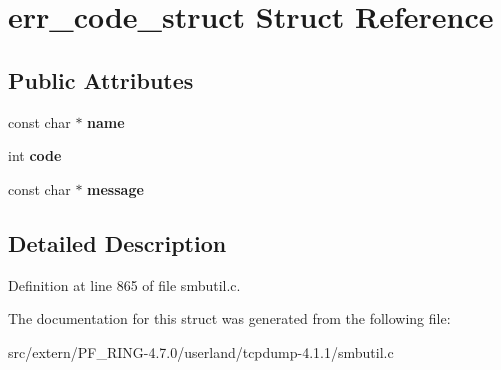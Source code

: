 \hypertarget{structerr__code__struct}{
\section{err\_\-code\_\-struct Struct Reference}
\label{structerr__code__struct}
}
\subsection*{Public Attributes}
\begin{DoxyCompactItemize}
\item 
\hypertarget{structerr__code__struct_a6152287c1c2d6b6599e274018e4a323a}{
const char $\ast$ {\bfseries name}}
\label{structerr__code__struct_a6152287c1c2d6b6599e274018e4a323a}

\item 
\hypertarget{structerr__code__struct_a2287dc8306b19ca221119add37a4ec1f}{
int {\bfseries code}}
\label{structerr__code__struct_a2287dc8306b19ca221119add37a4ec1f}

\item 
\hypertarget{structerr__code__struct_a0f1bf83ef1664f0df8f6dfcc7bd99692}{
const char $\ast$ {\bfseries message}}
\label{structerr__code__struct_a0f1bf83ef1664f0df8f6dfcc7bd99692}

\end{DoxyCompactItemize}


\subsection{Detailed Description}


Definition at line 865 of file smbutil.c.



The documentation for this struct was generated from the following file:\begin{DoxyCompactItemize}
\item 
src/extern/PF\_\-RING-\/4.7.0/userland/tcpdump-\/4.1.1/smbutil.c\end{DoxyCompactItemize}

